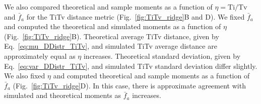 \documentclass[10pt,letterpaper]{article}
\begin{document}
\vspace{0.22cm}

\begin{minipage}[c]{0.65\textwidth}\hspace{-0.6cm}
\end{minipage}\hspace{-0.8cm}
\begin{minipage}[c]{0.35\textwidth}
	\captionsetup{type=figure}\label{fig:TiTv-vs-maf}
\end{minipage}

We also compared theoretical and sample moments as a function of $\eta = \text{Ti/Tv}$ and $\bar{f}_a$ for the TiTv distance metric (Fig.~\ref{fig:TiTv_ridge}B and D). We fixed $\bar{f}_a$ and computed the theoretical and simulated moments as a function of $\eta$ (Fig.~\ref{fig:TiTv_ridge}B). Theoretical average TiTv distance, given by Eq.~\ref{eq:mu_DDistr_TiTv}, and simulated TiTv average distance are approximately equal as $\eta$ increases. Theoretical standard deviation, given by Eq.~\ref{eq:var_DDistr_TiTv}, and simulated TiTv standard deviation differ slightly. We also fixed $\eta$ and computed theoretical and sample moments as a function of $\bar{f}_a$ (Fig.~\ref{fig:TiTv_ridge}D). In this case, there is approximate agreement with simulated and theoretical moments as $\bar{f}_a$ increases.
\end{document}
